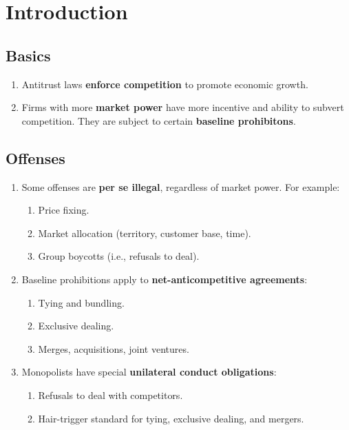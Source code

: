 \section{Introduction}

\subsection{Basics}

\begin{enumerate}
    \item Antitrust laws \textbf{enforce competition} to promote economic growth.
    \item Firms with more \textbf{market power} have more incentive and ability 
    to subvert competition. They are subject to certain \textbf{baseline 
    prohibitons}.
\end{enumerate}

\subsection{Offenses}

\begin{enumerate}
    \item Some offenses are \textbf{per se illegal}, regardless of market power. 
    For example:
    \begin{enumerate}
        \item Price fixing.
        \item Market allocation (territory, customer base, time).
        \item Group boycotts (i.e., refusals to deal).
    \end{enumerate}
    \item Baseline prohibitions apply to \textbf{net-anticompetitive 
    agreements}:
    \begin{enumerate}
        \item Tying and bundling.
        \item Exclusive dealing.
        \item Merges, acquisitions, joint ventures.
    \end{enumerate}
    \item Monopolists have special \textbf{unilateral conduct obligations}:
    \begin{enumerate}
        \item Refusals to deal with competitors.
        \item Hair-trigger standard for tying, exclusive dealing, and mergers.
    \end{enumerate}
\end{enumerate}

